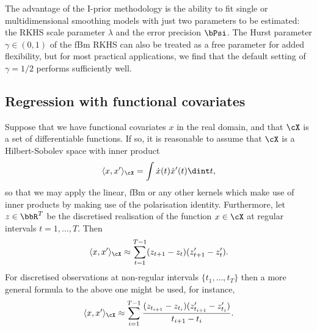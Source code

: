 The advantage of the I-prior methodology is the ability to fit single or multidimensional smoothing models with just two parameters to be estimated: the RKHS scale parameter $\lambda$ and the error precision $\bPsi$.
The Hurst parameter $\gamma \in (0,1)$ of the fBm RKHS can also be treated as a free parameter for added flexibility, but for most practical applications, we find that the default setting of $\gamma = 1/2$ performs sufficiently well.

\subsection{Regression with functional covariates}

Suppose that we have functional covariates $x$ in the real domain, and that $\cX$ is a set of differentiable functions.
If so, it is reasonable to assume that $\cX$ is a Hilbert-Sobolev space with inner product
%
\[
  \langle x,x' \rangle_\cX = \int \dot{x}(t) \dot{x}'(t) \dint t,
\]
%
so that we may apply the linear, fBm or any other kernels which make use of inner products by making use of the polarisation identity.
Furthermore, let $z \in \bbR^T$ be the discretised realisation of the function $x \in \cX$ at regular intervals $t = 1,\dots,T$. Then
%
\[
  \langle x,x' \rangle_\cX \approx \sum_{t=1}^{T-1} (z_{t+1} - z_t)(z'_{t+1} - z_t').
\]
%
For discretised observations at non-regular intervals $\{t_1,\dots,t_T\}$ then a more general formula to the above one might be used, for instance,
\[
  \langle x,x' \rangle_\cX \approx \sum_{i=1}^{T-1} \frac{(z_{t_{i+1}} - z_{t_i})(z'_{t_{i+1}} - z_{t_i}')}{t_{i+1} - t_{i}}.
\]
